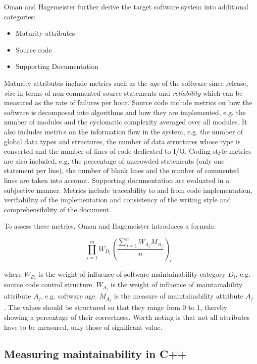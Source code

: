 Oman and Hagemeister further derive the target software system into additional
categories:

\begin{itemize}
\item Maturity attributes
\item Source code
\item Supporting Documentation
\end{itemize}

Maturity attributes include metrics such as the \textit{age} of the software
since release, \textit{size} in terms of non-commented source statements and
\textit{reliability} which can be measured as the rate of failures per hour.
Source code include metrics on how the software is decomposed into algorithms
and how they are implemented, e.g. the number of modules and the cyclomatic
complexity averaged over all modules. It also includes metrics on the
information flow in the system, e.g. the number of global data types and
structures, the number of data structures whose type is converted and the
number of lines of code dedicated to I/O. Coding style metrics are also
included, e.g. the percentage of uncrowded statements (only one statement per
line), the number of blank lines and the number of commented lines are taken
into account. Supporting documentation are evaluated in a subjective manner.
Metrics include traceability to and from code implementation, verifiability of
the implementation and consistency of the writing style and comprehensibility
of the document. \cite{oman1992metrics}

To assess these metrics, Oman and Hagemeister introduces a formula:

$$
\prod_{i=1}^m{W_D_i(\frac{\sum_{j=1}^n{W_A_jM_A_j}}{n})_i}
$$

where $W_D_i$ is the weight of influence of software maintainability category
$D_i$, e.g.  source code control structure. $W_A_j$ is the weight of influence
of maintainability attribute $A_j$, e.g. software age. $M_A_j$ is the measure
of maintainability attribute $A_j$. The values should be structured so that
they range from 0 to 1, thereby showing a percentage of their correctness.
Worth noting is that not all attributes have to be measured, only those of
significant value.

\subsection{Measuring maintainability in C++}


